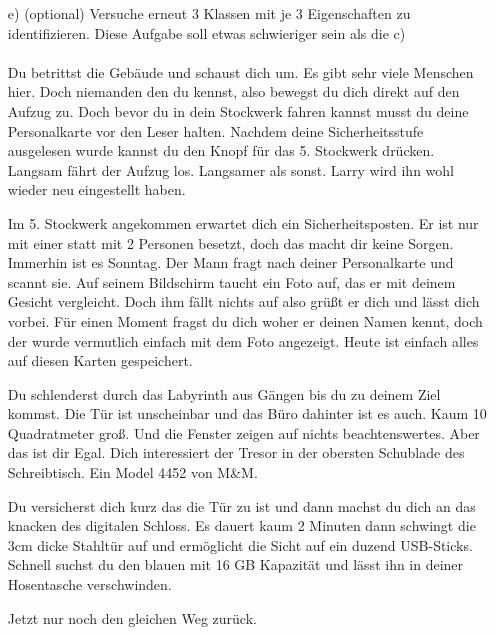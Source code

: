 \begin{enumerate}
\item[e)] (optional) Versuche erneut 3 Klassen mit je 3 Eigenschaften  zu identifizieren. Diese Aufgabe soll etwas schwieriger sein als die c)
\paragraph{}
Du betrittst die Gebäude und schaust dich um. Es gibt sehr viele Menschen hier. Doch niemanden den du kennst, also bewegst du dich direkt auf den Aufzug zu. Doch bevor du in dein Stockwerk fahren kannst musst du deine Personalkarte vor den Leser halten. Nachdem deine Sicherheitsstufe ausgelesen wurde kannst du den Knopf für das 5. Stockwerk drücken. Langsam fährt der Aufzug los. Langsamer als sonst. Larry wird ihn wohl wieder neu eingestellt haben.

Im 5. Stockwerk angekommen erwartet dich ein Sicherheitsposten. Er ist nur mit einer statt mit 2 Personen besetzt, doch das macht dir keine Sorgen. Immerhin ist es Sonntag. Der Mann fragt nach deiner Personalkarte und scannt sie. Auf seinem Bildschirm taucht ein Foto auf, das er mit deinem Gesicht vergleicht. Doch ihm fällt nichts auf also grüßt er dich und lässt dich vorbei. Für einen Moment fragst du dich woher er deinen Namen kennt, doch der wurde vermutlich einfach mit dem Foto angezeigt. Heute ist einfach alles auf diesen Karten gespeichert.

Du schlenderst durch das Labyrinth aus Gängen bis du zu deinem Ziel kommst. Die Tür ist unscheinbar und das Büro dahinter ist es auch. Kaum 10 Quadratmeter groß. Und die Fenster zeigen auf nichts beachtenswertes. Aber das ist dir Egal. Dich interessiert der Tresor in der obersten Schublade des Schreibtisch. Ein Model 4452 von M&M.

Du versicherst dich kurz das die Tür zu ist und dann machst du dich an das knacken des digitalen Schloss. Es dauert kaum 2 Minuten dann schwingt die 3cm dicke Stahltür auf und ermöglicht die Sicht auf ein duzend USB-Sticks. Schnell suchst du den blauen mit 16 GB Kapazität und lässt ihn in deiner Hosentasche verschwinden.

Jetzt nur noch den gleichen Weg zurück.
\end{enumerate}
